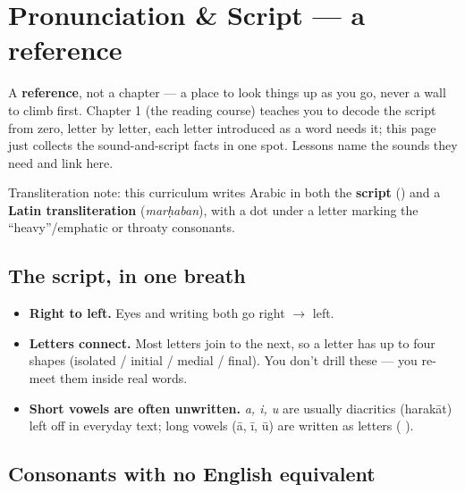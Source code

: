
\chapter*{Pronunciation \& Script --- a reference}

A \textbf{reference}, not a chapter — a place to look things up as you go, never a wall to climb first. Chapter 1 (the reading course) teaches you to decode the script from zero, letter by letter, each letter introduced as a word needs it; this page just collects the sound-and-script facts in one spot. Lessons name the sounds they need and link here.

Transliteration note: this curriculum writes Arabic in both the \textbf{script} () and a \textbf{Latin transliteration} (\emph{marḥaban}), with a dot under a letter marking the \textquotedblleft{}heavy\textquotedblright{}/emphatic or throaty consonants.

\section*{The script, in one breath}

\begin{itemize}
\raggedright
\setlength{\itemsep}{0.35em}
  \item \textbf{Right to left.} Eyes and writing both go right $\to$ left.
  \item \textbf{Letters connect.} Most letters join to the next, so a letter has up to four shapes (isolated / initial / medial / final). You don't drill these — you re-meet them inside real words.
  \item \textbf{Short vowels are often unwritten.} \emph{a, i, u} are usually diacritics (harakāt) left off in everyday text; long vowels (ā, ī, ū) are written as letters (  ).
\end{itemize}

\section*{Consonants with no English equivalent}

